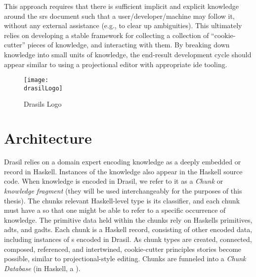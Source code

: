 This approach requires that there is sufficient implicit and explicit knowledge
around the \acs{srs} document such that a user/developer/machine may follow it,
without any external assistance (e.g., to clear up ambiguities). This ultimately
relies on developing a stable framework for collecting a collection of
``cookie-cutter'' pieces of knowledge, and interacting with them. By breaking
down knowledge into small units of knowledge, the end-result development cycle
should appear similar to using a projectional editor with appropriate \acs{ide}
tooling.


\begin{figure}[H]
      \centering
      \caption{Drasils Logo}
      \label{fig:drasilLogo}
      \texttt{[image: \\drasilLogo]}
\end{figure}

\drasilPersonification

\section{Architecture}

Drasil relies on a domain expert encoding knowledge as a deeply embedded
 or record in Haskell. Instances of the knowledge also appear in the
Haskell source code. When knowledge is encoded in Drasil, we refer to it as a
\textit{Chunk} or \textit{knowledge fragment} (they will be used interchangeably
for the purposes of this thesis). The chunks relevant Haskell-level type is its
classifier, and each chunk must have a  so that one might be able to
refer to a specific occurrence of knowledge. The primitive data held within the
chunks rely on Haskells primitives, \acsp{adt}, and \acsp{gadt}. Each chunk is a
Haskell record, consisting of other encoded data, including instances of
s encoded in Drasil. As chunk types are created, connected, composed,
referenced, and intertwined, cookie-cutter principles stories become possible,
similar to projectional-style editing. Chunks are funneled into a \textit{Chunk
      Database} (in Haskell, a \ChunkDB{}).


